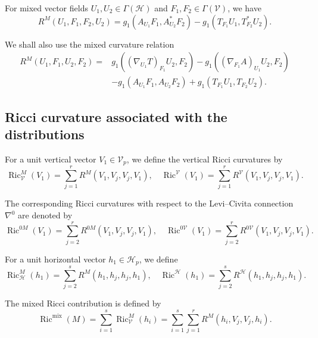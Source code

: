 \documentclass[10pt,a4paper]{article}
\theoremstyle{definition}
\theoremstyle{remark}
\numberwithin{equation}{section}
\begin{document}
For mixed vector fields
$U_1,U_2\in\Gamma(\mathcal H)$ and
$F_1,F_2\in\Gamma(\mathcal V)$, we have
\begin{equation}
R^{M}(U_1,F_1,F_2,U_2)
=
g_1(A_{U_1}F_1,A^{*}_{U_2}F_2)
-
g_1(T_{F_1}U_1,T^{*}_{F_2}U_2).
\label{eq-Gauss-mix}
\end{equation}

We shall also use the mixed curvature relation
\begin{align}
R^{M}(U_1,F_1,U_2,F_2)
={}&
g_1\left((\nabla_{U_1}T)_{F_1}U_2,F_2\right)
-
g_1\left((\nabla_{F_1}A)_{U_1}U_2,F_2\right)
\nonumber\\
&-
g_1(A_{U_1}F_1,A_{U_2}F_2)
+
g_1(T_{F_1}U_1,T_{F_2}U_2).
\label{eq-Gauss-mix-1}
\end{align}

\subsection{Ricci curvature associated with the distributions}

For a unit vertical vector $V_1\in\mathcal V_p$, we define the vertical
Ricci curvatures by
\begin{equation}
\operatorname{Ric}_{\mathcal V}^{M}(V_1)
=
\sum_{j=1}^{r}
R^{M}(V_1,V_j,V_j,V_1), \quad \operatorname{Ric}^{\mathcal V}(V_1)
=
\sum_{j=1}^{r}
R^{\mathcal V}(V_1,V_j,V_j,V_1).
\label{eq-Ric-vert}
\end{equation}

The corresponding Ricci curvatures with respect to the Levi--Civita
connection $\nabla^{0}$ are denoted by
\begin{equation}
\operatorname{Ric}^{0M}(V_1)
=
\sum_{j=2}^{r}
R^{0M}(V_1,V_j,V_j,V_1), \quad \operatorname{Ric}^{0\mathcal V}(V_1)
=
\sum_{j=2}^{r}
R^{0\mathcal V}(V_1,V_j,V_j,V_1).
\label{eq-Ric0}
\end{equation}

For a unit horizontal vector $h_1\in\mathcal H_p$, we define
\begin{equation}
\operatorname{Ric}_{\mathcal H}^{M}(h_1)
=
\sum_{j=2}^{s}
R^{M}(h_1,h_j,h_j,h_1), \quad \operatorname{Ric}^{\mathcal H}(h_1)
=
\sum_{j=2}^{s}
R^{\mathcal H}(h_1,h_j,h_j,h_1).
\label{eq-Ric-hor}
\end{equation}

The mixed Ricci contribution is defined by
\begin{equation}
\operatorname{Ric}^{\mathrm{mix}}(M)
=
\sum_{i=1}^{s}
\operatorname{Ric}_{\mathcal V}^{M}(h_i)
=
\sum_{i=1}^{s}\sum_{j=1}^{r}
R^{M}(h_i,V_j,V_j,h_i).
\label{eq-Ric-mix}
\end{equation}
\end{document}

